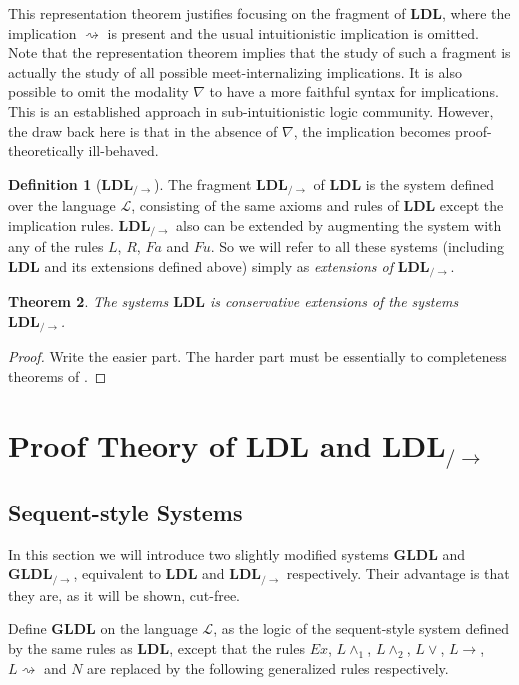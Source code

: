 \documentclass[12pt,a4paper]{article}
\theoremstyle{plain}
\newtheorem{thm}{Theorem}[section]
\theoremstyle{definition}
\newtheorem{dfn}[thm]{Definition}
\begin{document}
This representation theorem justifies focusing on the fragment of $\mathbf{LDL}$, where the implication $\rightsquigarrow$ is present and the usual intuitionistic implication is omitted. Note that the representation theorem implies that the study of such a fragment is actually the study of all possible meet-internalizing implications. It is also possible to omit the modality $\nabla$ to have a more faithful syntax for implications. This is an established approach in sub-intuitionistic logic community. However, the draw back here is that in the absence of $\nabla$, the implication becomes proof-theoretically ill-behaved.

\begin{dfn} [$\mathbf{LDL}_{/\rightarrow}$]
	The fragment $\mathbf{LDL}_{/\rightarrow}$ of $\mathbf{LDL}$ is the system defined over the language $\mathcal{L}$, consisting of the same axioms and rules of $\mathbf{LDL}$ except the implication rules. 
	$\mathbf{LDL}_{/\rightarrow}$ also can be extended by augmenting the system with any of the rules $L$, $R$, $Fa$ and $Fu$. So we will refer to all these systems (including $\mathbf{LDL}$ and its extensions defined above) simply as \emph{extensions of} $\mathbf{LDL}_{/\rightarrow}$.
\end{dfn}

\begin{thm}
The systems $\mathbf{LDL}$ is conservative extensions of the systems $\mathbf{LDL}_{/\rightarrow}$.
\end{thm}
\begin{proof}
Write the easier part. The harder part must be essentially to completeness theorems of \cite{Amir}.
\end{proof}


\section{Proof Theory of $\mathbf{LDL}$ and $\mathbf{LDL}_{/\rightarrow}$}

\subsection{Sequent-style Systems}
In this section we will introduce two slightly modified systems $\mathbf{GLDL}$ and $\mathbf{GLDL}_{/\rightarrow}$, equivalent to $\mathbf{LDL}$ and $\mathbf{LDL}_{/\rightarrow}$ respectively. Their advantage is that they are, as it will be shown, cut-free.

Define $\mathbf{GLDL}$ on the language $\mathcal{L}$, as the logic of the sequent-style system defined by the same rules as $\mathbf{LDL}$, except that the rules $Ex$, $L\wedge_1$, $L\wedge_2$, $L\vee$, $L\rightarrow$, $L\rightsquigarrow$ and $N$ are replaced by the following generalized rules respectively.
\end{document}
